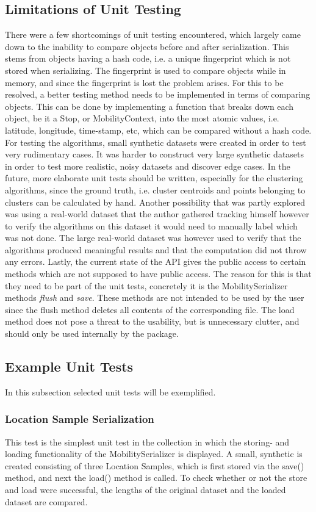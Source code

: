\subsection{Limitations of Unit Testing}
There were a few shortcomings of unit testing encountered, which largely came down to the inability to compare objects before and after serialization. This stems from objects having a hash code, i.e. a unique fingerprint which is not stored when serializing. The fingerprint is used to compare objects while in memory, and since the fingerprint is lost the problem arises. For this to be resolved, a better testing method needs to be implemented in terms of comparing objects. This can be done by implementing a function that breaks down each object, be it a Stop, or MobilityContext, into the most atomic values, i.e. latitude, longitude, time-stamp, etc, which can be compared without a hash code. For testing the algorithms, small synthetic datasets were created in order to test very rudimentary cases. It was harder to construct very large synthetic datasets in order to test more realistic, noisy datasets and discover edge cases. In the future, more elaborate unit tests should be written, especially for the clustering algorithms, since the ground truth, i.e. cluster centroids and points belonging to clusters can be calculated by hand. Another possibility that was partly explored was using a real-world dataset that the author gathered tracking himself however to verify the algorithms on this dataset it would need to manually label which was not done. The large real-world dataset was however used to verify that the algorithms produced meaningful results and that the computation did not throw any errors. Lastly, the current state of the API gives the public access to certain methods which are not supposed to have public access. The reason for this is that they need to be part of the unit tests, concretely it is the MobilitySerializer methods \textit{flush} and \textit{save}. These methods are not intended to be used by the user since the flush method deletes all contents of the corresponding file. The load method does not pose a threat to the usability, but is unnecessary clutter, and should only be used internally by the package. 

\subsection{Example Unit Tests}
In this subsection selected unit tests will be exemplified.

\subsubsection*{Location Sample Serialization}
This test is the simplest unit test in the collection in which the storing- and loading functionality of the MobilitySerializer is displayed. A small, synthetic is created consisting of three Location Samples, which is first stored via the save() method, and next the load() method is called. To check whether or not the store and load were successful, the lengths of the original dataset and the loaded dataset are compared. 

